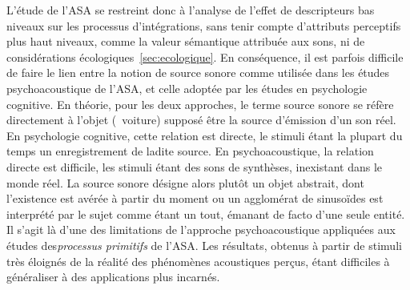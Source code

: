 

L'étude de l'ASA se restreint donc à l'analyse de l'effet de descripteurs bas niveaux sur les processus d'intégrations, sans tenir compte d'attributs perceptifs plus haut niveaux, comme la valeur sémantique attribuée aux sons, ni de considérations écologiques~\ref{sec:ecologique}. En conséquence, il est parfois difficile de faire le lien entre la notion de source sonore comme utilisée dans les études psychoacoustique de l'ASA, et celle adoptée par les études en psychologie cognitive. En théorie, pour les deux approches, le terme source sonore se réfère directement à l'objet (\eg~voiture) supposé être la source d'émission d'un son réel. En psychologie cognitive, cette relation est directe, le stimuli étant la plupart du temps un enregistrement de ladite source. En psychoacoustique, la relation directe est difficile, les stimuli étant des sons de synthèses, inexistant dans le monde réel. La source sonore désigne alors plutôt un objet abstrait, dont l’existence est avérée à partir du moment ou un agglomérat de sinusoïdes est interprété par le sujet comme étant un tout, émanant de facto d'une seule entité. Il s'agit là d'une des limitations de l'approche psychoacoustique appliquées aux études des\emph{processus primitifs} de l'ASA. Les résultats, obtenus à partir de stimuli très éloignés de la réalité des phénomènes acoustiques perçus, étant difficiles à généraliser à des applications plus incarnés.

